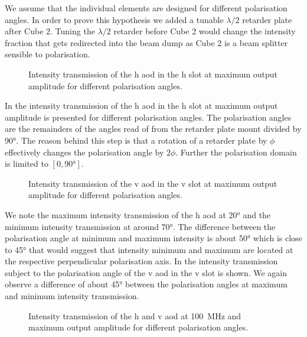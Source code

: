 We assume that the individual elements are designed for different
polarisation angles. In order to prove this hypothesis we added a tunable
$\lambda/2$ retarder plate after Cube 2. Tuning the $\lambda/2$ retarder
before Cube 2 would change the intensity fraction that gets redirected into
the beam dump as Cube 2 is a beam splitter sensible to polarisation.
\begin{figure}[htb]
  \centering
  \begin{adjustbox}{width=\textwidth}
  \end{adjustbox}
  \caption{Intensity transmission of the \gls{h} \gls{aod} in the \gls{h} slot
    at maximum output amplitude for different polarisation angles.
  }\label{fig:intensity_polarisation_h}
\end{figure}
In  the intensity transmission of the
\gls{h} \gls{aod} in the \gls{h} slot at maximum output amplitude is presented
for different polarisation angles. The polarisation angles are the remainders
of the angles read of from the retarder plate mount divided by \ang{90}. The
reason behind this step is that a rotation of a retarder plate by $\phi$
effectively changes the polarisation angle by $2\phi$. Further the
polarisation domain is limited to $\left[0,\ang{90}\right]$.
\begin{figure}[htb]
  \centering
  \begin{adjustbox}{width=\textwidth}
  \end{adjustbox}
  \caption{Intensity transmission of the \gls{v} \gls{aod} in the \gls{v} slot
    at maximum output amplitude for different polarisation angles.
  }\label{fig:intensity_polarisation_v}
\end{figure}
We note the maximum intensity transmission of the \gls{h} \gls{aod} at
\ang{20} and the minimum intensity transmission at around \ang{70}. The
difference between the polarisation angle at minimum and maximum intensity
is about \ang{50} which is close to \ang{45} that would suggest that
intensity minimum and maximum are located at the respective perpendicular
polarisation axis. In  the intensity
transmission subject to the polarisation angle of the \gls{v} \gls{aod} in
the \gls{v} slot is shown. We again observe a difference of about \ang{45}
between the polarisation angles at maximum and minimum intensity transmission.
\begin{figure}[htb]
  \centering
  \begin{adjustbox}{width=\textwidth}
  \end{adjustbox}
  \caption{Intensity transmission of the \gls{h} and \gls{v} \gls{aod} at
    \SI{100}{\mega\hertz} and maximum output amplitude for different
    polarisation angles.
  }\label{fig:intensity_polarisation}
\end{figure}
